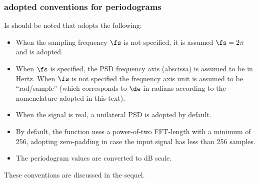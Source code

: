 \subsubsection{{\matlab} adopted conventions for periodograms}

Is should be noted that {\matlab} adopts the following:
\begin{itemize}
	\item When the sampling frequency $\fs$ is not specified, it is assumed $\fs = 2 \pi$ and  is adopted.
	\item When $\fs$ is specified, the PSD frequency axis (abscissa) is assumed to be in Hertz. When $\fs$ is not specified
	the frequency axis unit is assumed to be ``rad/sample'' (which corresponds to $\dw$ in radians according to the nomenclature adopted in this text).
	\item When the signal is real, a unilateral PSD is adopted by default.
	\item By default, the  function uses a power-of-two FFT-length with a minimum of 256, adopting zero-padding in case the input signal has less than 256 samples.
	\item The periodogram values are converted to dB scale.
\end{itemize}
These conventions are discussed in the sequel.




